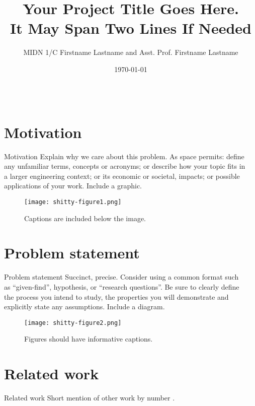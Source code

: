 \documentclass[pdf]{beamer}
\title{\huge Your Project Title Goes Here.\\ It May Span Two Lines If Needed}
\author{MIDN 1/C Firstname Lastname and Asst. Prof. Firstname Lastname}
\institute[WRCE]{$^{1}$Weapons, Robotics, and Control Engineering, United States Naval Academy}
\date{\today}
\begin{document}
\begin{frame}[fragile]
\begin{columns}

\begin{column}{0.25\textwidth}
\section{Motivation}
\begin{block}{Motivation}
Explain why we care about this problem.  As space permits: define any unfamiliar terms, concepts or acronyms; or describe how your topic fits in a larger engineering context; or its economic or societal, impacts; or possible applications of your work.  Include a graphic.
\begin{figure}
\texttt{[image: shitty-figure1.png]}
\caption{Captions are included below the image.}
\end{figure}
\end{block}

\section{Problem statement}
\begin{block}{Problem statement}
Succinct, precise. Consider using a common format such as ``given-find'', hypothesis, or ``research questions''. Be sure to clearly define the process you intend to study, the properties you will demonstrate and explicitly state any assumptions.  Include a diagram. 
\begin{figure}
\texttt{[image: shitty-figure2.png]}
\caption{Figures should have informative captions.}
\end{figure}
\end{block}

\section{Related work}
\begin{block}{Related work}
Short mention of other work by number \cite{chen1993linear,chen1965automatic}. %
\end{block}
\end{column}

\begin{column}{0.25\textwidth}

\end{column}
\end{columns}
\end{frame}
\end{document}
